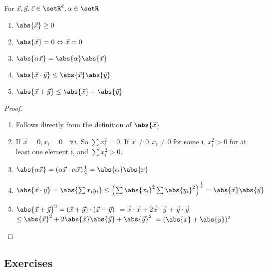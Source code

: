 \documentclass[12pt, letterpaper]{paper}
\begin{document}
\begin{theorem}
  \label{thr:1.37}
  For $\vec{x}, \vec{y}, \vec{z} \in \setR^{k}, \alpha \in \setR$
  \begin{enumerate}
  \item $\abs{\vec{x}} \geq 0$
  \item $\abs{\vec{x}} = 0 \Leftrightarrow \vec{x} = 0$
  \item $\abs{\alpha \vec{x}} = \abs{\alpha} \abs{\vec{x}}$
  \item
    $\abs{ \vec{x} \cdot \vec{y} } \leq \abs{\vec{x} } \abs{\vec{y}}$
  \item $\abs{ \vec{x} + \vec{y} } \leq \abs{\vec{x}} + \abs{\vec{y}}$
  \end{enumerate}
\end{theorem}

\begin{proof}
  \begin{enumerate}
  \item Follows directly from the definition of $\abs{\vec{x}}$
  \item If $\vec{x} = 0, x_{i} = 0 \quad \forall i$. So
    $\sum x_{i}^{2} = 0$. If $\vec{x} \neq 0, x_{i} \neq 0$ for some
    i. $x_{i}^{2} > 0$ for at least one element i, and
    $\sum_{ }x_{i}^{2} > 0$.
  \item
    $\abs{\alpha \vec{x}} = ( \alpha \vec{x} \cdot \alpha \vec{x}
    )^{}{\frac{1}{2}} = \abs{\alpha} \abs{ x }$
  \item
    $\abs{ \vec{x} \cdot \vec{y} } = \abs{ \sum x_{i} y_{i} } \leq
    \left ( \sum \abs{x_{i}}^2 \sum \abs{y_{i}}^{2} \right
    )^{\frac{1}{2}} = \abs{\vec{x}} \abs{\vec{y}}$
  \item
    $\abs{ \vec{x} + \vec{y}}^{2} = (\vec{x} + \vec{y}) \cdot (\vec{x}
    + \vec{y})$ \newline
    $= \vec{x} \cdot \vec{x} + 2\vec{x} \cdot \vec{y} + \vec{y} \cdot
    \vec{y}$ \newline
    $\leq \abs{\vec{x}}^{2} + 2 \abs{\vec{x}} \abs{\vec{y}} +
    \abs{\vec{y}}^2$ \newline $= ( \abs{x} + \abs{y} )^2$
  \end{enumerate}
\end{proof}

\vspace{ .33in }

\subsection{Exercises}
\label{sec:org4a96c4c}
\end{document}
